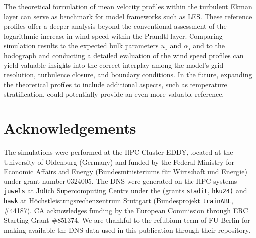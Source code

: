 \documentclass[smallcondensed,final]{svjour3}
\begin{document}
The theoretical formulation of mean velocity profiles within the turbulent Ekman layer can serve as benchmark for model frameworks such as LES. These reference profiles offer a deeper analysis beyond the conventional assessment of the logarithmic increase in wind speed within the Prandtl layer. Comparing simulation results to the expected bulk parameters $u_\star$ and $\alpha_\star$ and to the hodograph and conducting a detailed evaluation of the wind speed profiles can yield valuable insights into the correct interplay among the model's grid resolution, turbulence closure, and boundary conditions. In the future, expanding the theoretical profiles to include additional aspects, such as temperature stratification, could potentially provide an even more valuable reference.

\section{Acknowledgements}

The simulations were performed at the HPC Cluster EDDY, located at the University of Oldenburg (Germany) and funded by the Federal Ministry for Economic Affairs and Energy (Bundesministeriums für Wirtschaft und Energie) under grant number 0324005. The DNS were generated on the HPC systems \texttt{juwels} at J\"ulich Supercomputing Centre under the (grants \texttt{stadit}, \texttt{hku24)} and \texttt{hawk} at H\"ochstleistungs\-rechen\-zentrum Stuttgart (Bundesprojekt \texttt{trainABL}, \#44187). CA acknowledges funding by the European Commission through ERC Starting Grant \#851374. We are thankful to the refubium team of FU Berlin for making available the DNS data used in this publication through their repository. 



\end{document}
